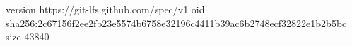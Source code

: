 version https://git-lfs.github.com/spec/v1
oid sha256:2c67156f2ee2fb23e5574b6758e32196c4411b39ac6b2748ecf32822e1b2b5bc
size 43840
